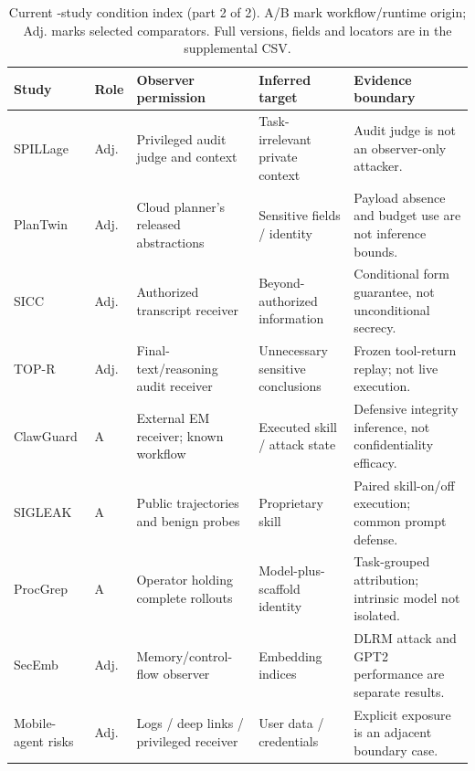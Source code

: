 \begin{table}[!t]
\centering\footnotesize
\setlength{\tabcolsep}{3pt}\renewcommand{\arraystretch}{1.08}
\caption{Current \FinalN{}-study condition index (part 2 of 2). A/B mark workflow/runtime origin; Adj. marks selected comparators. Full versions, fields and locators are in the supplemental CSV.}
\label{tab:final-study-matrix-2}
\begin{tabularx}{\textwidth}{@{}>{\raggedright\arraybackslash}p{}>{\raggedright\arraybackslash}p{}>{\raggedright\arraybackslash}p{}>{\raggedright\arraybackslash}p{}Y@{}}
\toprule Study & Role & Observer permission & Inferred target & Evidence boundary \\
\midrule
SPILLage \cite{roh2026spillage} & Adj. & Privileged audit judge and context & Task-irrelevant private context & Audit judge is not an observer-only attacker. \\
PlanTwin \cite{yu2026plantwin} & Adj. & Cloud planner's released abstractions & Sensitive fields / identity & Payload absence and budget use are not inference bounds. \\
SICC \cite{xu2026sicc} & Adj. & Authorized transcript receiver & Beyond-authorized information & Conditional form guarantee, not unconditional secrecy. \\
TOP-R \cite{qiao2026topr} & Adj. & Final-text/reasoning audit receiver & Unnecessary sensitive conclusions & Frozen tool-return replay; not live execution. \\
ClawGuard \cite{gan2026clawguard} & A & External EM receiver; known workflow & Executed skill / attack state & Defensive integrity inference, not confidentiality efficacy. \\
SIGLEAK \cite{geng2026sigleak} & A & Public trajectories and benign probes & Proprietary skill & Paired skill-on/off execution; common prompt defense. \\
ProcGrep \cite{oderinwale2026procgrep} & A & Operator holding complete rollouts & Model-plus-scaffold identity & Task-grouped attribution; intrinsic model not isolated. \\
SecEmb \cite{umar2025secemb} & Adj. & Memory/control-flow observer & Embedding indices & DLRM attack and GPT2 performance are separate results. \\
Mobile-agent risks\newline \cite{wu2025mobileagents} & Adj. & Logs / deep links / privileged receiver & User data / credentials & Explicit exposure is an adjacent boundary case. \\

\end{tabularx}
\end{table}
